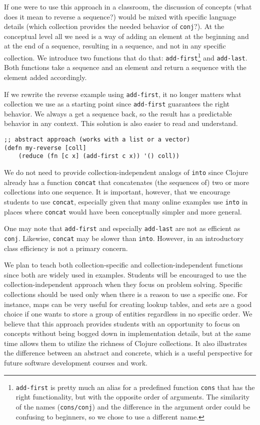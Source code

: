 \documentclass[submission,copyright,creativecommons]{eptcs}
\newcommand{\clocode}[1]{{\tt {#1}}}
\begin{document}
If one were to use this approach in a classroom, the discussion of concepts (what does it mean to reverse a sequence?) would be mixed with specific language details (which collection provides the needed behavior of \clocode{conj}?). At the conceptual level all we need is a way of adding an element at the beginning and at the end of a sequence, resulting in a sequence, and not in any specific collection. We introduce two functions that do that: \clocode{add-first}\footnote{\clocode{add-first} is pretty much an alias for a predefined function \clocode{cons} that has the right functionality, but with the opposite order of arguments. The similarity of the names (\clocode{cons/conj}) and the difference in the argument order could be confusing to beginners, so we chose to use a different name.} and \clocode{add-last}. Both functions take a sequence and an element and return a sequence with the element added accordingly. 

If we rewrite the reverse example using \clocode{add-first}, it no longer matters what collection we use as a starting point since \clocode{add-first} guarantees the right behavior. We always a get a sequence back, so the result has a predictable behavior in any context. This solution is also easier to read and understand. 
\begin{verbatim}
;; abstract approach (works with a list or a vector)
(defn my-reverse [coll]
    (reduce (fn [c x] (add-first c x)) '() coll)) 
\end{verbatim}

We do not need to provide collection-independent analogs of \clocode{into} since Clojure already has a function \clocode{concat} that concatenates (the sequences of) two or more collections into one sequence. It is important, however, that we encourage students to use \clocode{concat}, especially given that many online examples use \clocode{into} in places where \clocode{concat} would have been conceptually simpler and more general. 

One may note that \clocode{add-first} and especially \clocode{add-last} are not as efficient as \clocode{conj}. Likewise, \clocode{concat} may be slower than \clocode{into}. However, in an introductory class efficiency is not a primary concern. 

We plan to teach both collection-specific and collection-independent functions since both are widely used in examples. Students will be encouraged to use the collection-independent approach when they focus on problem solving. Specific collections should be used only when there is a reason to use a specific one. For instance, maps can be very useful for creating lookup tables, and sets are a good choice if one wants to store a group of entities regardless in no specific order. We believe that this approach provides students with an opportunity to focus on concepts without being bogged down in implementation details, but at the same time allows them to utilize the richness of Clojure collections. It also illustrates the difference between an abstract and concrete, which is a useful perspective for future software development courses and work. 
\end{document}

